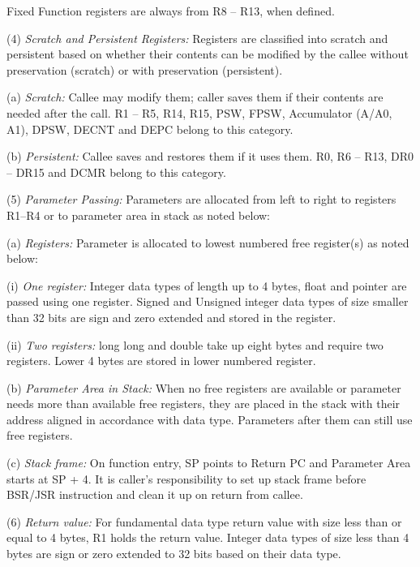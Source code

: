 \levelone
Fixed Function registers are always from R8 -- R13, when defined.

(4) \emph{Scratch and Persistent Registers:} %
Registers are classified into scratch and persistent based on whether their contents can be modified by 
the callee without preservation (scratch) or with preservation (persistent).

    \leveltwo
    (a) \emph{Scratch:} %
    Callee may modify them; caller saves them if their contents are needed after the call. R1 -- R5, 
    R14, R15, PSW, FPSW, Accumulator (A/A0, A1), DPSW, DECNT and DEPC belong to this category.

    (b) \emph{Persistent:} %
    Callee saves and restores them if it uses them. R0, R6 -- R13, DR0 -- DR15 and DCMR belong to this 
    category.

\levelone
(5) \emph{Parameter Passing:} %
Parameters are allocated from left to right to registers R1--R4 or to parameter area in stack as noted
below:

    \leveltwo
    (a) \emph{Registers:} %
    Parameter is allocated to lowest numbered free register(s) as noted below:

        \levelthree
        (i) \emph{One register:} %
        Integer data types of length up to 4 bytes, float and pointer are passed using one register. 
        Signed and Unsigned integer data types of size smaller than 32 bits are sign and zero 
        extended and stored in the register.

        (ii) \emph{Two registers:} %
        long long and double take up eight bytes and require two registers. Lower 4 bytes are
        stored in lower numbered register.

    \leveltwo
    (b) \emph{Parameter Area in Stack:} %
    When no free registers are available or parameter needs more than available free registers, 
    they are placed in the stack with their address aligned in accordance with data type. 
    Parameters after them can still use free registers.

    (c) \emph{Stack frame:} %
    On function entry, SP points to Return PC and Parameter Area starts at SP + 4. It is caller's
    responsibility to set up stack frame before BSR/JSR instruction and clean it up on return from
    callee.

\levelone
(6) \emph{Return value:} %
For fundamental data type return value with size less than or equal to 4 bytes, R1 holds the 
return value. Integer data types of size less than 4 bytes are sign or zero extended to 32 bits 
based on their data type. 

